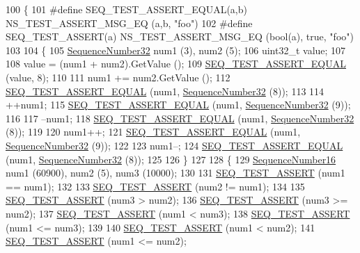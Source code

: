 \begin{DoxyCode}
100 \{
101 \textcolor{preprocessor}{#define SEQ\_TEST\_ASSERT\_EQUAL(a,b) NS\_TEST\_ASSERT\_MSG\_EQ (a,b, "foo")}
102 \textcolor{preprocessor}{#define SEQ\_TEST\_ASSERT(a) NS\_TEST\_ASSERT\_MSG\_EQ (bool(a), true, "foo")}
103 
104   \{
105     \hyperlink{classns3_1_1SequenceNumber}{SequenceNumber32} num1 (3), num2 (5);
106     uint32\_t value;
107 
108     value = (num1 + num2).GetValue ();
109     \hyperlink{sequence-number-test-suite_8cc_a406e684f8ee1fd1d725d8f96966ec9ff}{SEQ\_TEST\_ASSERT\_EQUAL} (value, 8);
110 
111     num1 += num2.GetValue ();
112     \hyperlink{sequence-number-test-suite_8cc_a406e684f8ee1fd1d725d8f96966ec9ff}{SEQ\_TEST\_ASSERT\_EQUAL} (num1, \hyperlink{classns3_1_1SequenceNumber}{SequenceNumber32} (8));
113 
114     ++num1;
115     \hyperlink{sequence-number-test-suite_8cc_a406e684f8ee1fd1d725d8f96966ec9ff}{SEQ\_TEST\_ASSERT\_EQUAL} (num1, \hyperlink{classns3_1_1SequenceNumber}{SequenceNumber32} (9));
116 
117     --num1;
118     \hyperlink{sequence-number-test-suite_8cc_a406e684f8ee1fd1d725d8f96966ec9ff}{SEQ\_TEST\_ASSERT\_EQUAL} (num1, \hyperlink{classns3_1_1SequenceNumber}{SequenceNumber32} (8));
119 
120     num1++;
121     \hyperlink{sequence-number-test-suite_8cc_a406e684f8ee1fd1d725d8f96966ec9ff}{SEQ\_TEST\_ASSERT\_EQUAL} (num1, \hyperlink{classns3_1_1SequenceNumber}{SequenceNumber32} (9));
122 
123     num1--;
124     \hyperlink{sequence-number-test-suite_8cc_a406e684f8ee1fd1d725d8f96966ec9ff}{SEQ\_TEST\_ASSERT\_EQUAL} (num1, \hyperlink{classns3_1_1SequenceNumber}{SequenceNumber32} (8));
125 
126   \}
127 
128   \{
129     \hyperlink{classns3_1_1SequenceNumber}{SequenceNumber16} num1 (60900), num2 (5), num3 (10000);
130 
131     \hyperlink{sequence-number-test-suite_8cc_a6fa0724417167ff8a5aee24421cc7c44}{SEQ\_TEST\_ASSERT} (num1 == num1);
132 
133     \hyperlink{sequence-number-test-suite_8cc_a6fa0724417167ff8a5aee24421cc7c44}{SEQ\_TEST\_ASSERT} (num2 != num1);
134 
135     \hyperlink{sequence-number-test-suite_8cc_a6fa0724417167ff8a5aee24421cc7c44}{SEQ\_TEST\_ASSERT} (num3 > num2);
136     \hyperlink{sequence-number-test-suite_8cc_a6fa0724417167ff8a5aee24421cc7c44}{SEQ\_TEST\_ASSERT} (num3 >= num2);
137     \hyperlink{sequence-number-test-suite_8cc_a6fa0724417167ff8a5aee24421cc7c44}{SEQ\_TEST\_ASSERT} (num1 < num3);
138     \hyperlink{sequence-number-test-suite_8cc_a6fa0724417167ff8a5aee24421cc7c44}{SEQ\_TEST\_ASSERT} (num1 <= num3);
139 
140     \hyperlink{sequence-number-test-suite_8cc_a6fa0724417167ff8a5aee24421cc7c44}{SEQ\_TEST\_ASSERT} (num1 < num2);
141     \hyperlink{sequence-number-test-suite_8cc_a6fa0724417167ff8a5aee24421cc7c44}{SEQ\_TEST\_ASSERT} (num1 <= num2);

\end{DoxyCode}
